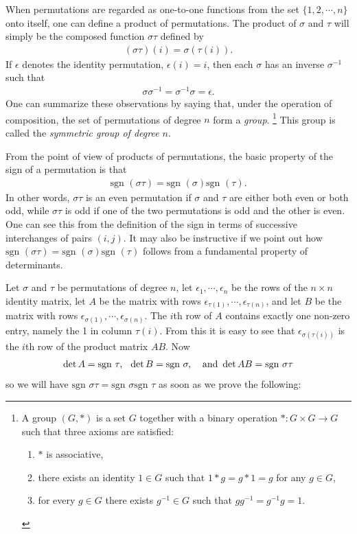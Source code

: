 \documentclass[12pt,letterpaper,reqno]{article}
\numberwithin{equation}{section}
\newcommand{\ti}[1]{\textit{#1}}
\begin{document}
When permutations are regarded as one-to-one functions from the set $\{1,2,\cdots,n\}$ onto itself, one can define a product of permutations. The product of $\sigma$ and $\tau$ will simply be the composed function $\sigma \tau$ defined by
\begin{align*}
	(\sigma \tau)(i)=\sigma(\tau(i)).
\end{align*}
If $\epsilon$ denotes the identity permutation, $\epsilon(i)=i$, then each $\sigma$ has an inverse $\sigma^{-1}$ such that 
\begin{align*}
	\sigma\sigma^{-1}=\sigma^{-1}\sigma=\epsilon.
\end{align*}
One can summarize these observations by saying that, under the operation of composition, the set of permutations of degree $n$ form a \ti{group}. \footnote{A group $(G,*)$ is a set $G$ together with a binary operation $*:G \times G \to G$ such that three axioms are satisfied: \begin{enumerate}
	\item $*$ is associative,
	\item there exists an identity $1 \in G$ such that $1*g=g*1=g$ for any $g \in G$,
	\item for every $g \in G$ there exists $g^{-1} \in G$ such that $gg^{-1}=g^{-1}g=1$.
\end{enumerate}} This group is called the \ti{symmetric group of degree $n$}.

From the point of view of products of permutations, the basic property of the sign of a permutation is that 
\begin{align*}
	\text{sgn } (\sigma \tau)=\text{sgn } (\sigma)\text{sgn } (\tau).
\end{align*}
In other words, $\sigma\tau$ is an even permutation if $\sigma$ and $\tau$ are either both even or both odd, while $\sigma\tau$ is odd if one of the two permutations is odd and the other is even. One can see this from the definition of the sign in terms of successive interchanges of pairs $(i,j)$. It may also be instructive if we point out how $\text{sgn } (\sigma \tau)=\text{sgn } (\sigma)\text{sgn } (\tau)$ follows from a fundamental property of determinants.

Let $\sigma$ and $\tau$ be permutations of degree $n$, let $\epsilon_1,\cdots, \epsilon_n$ be the rows of the $n \times n$ identity matrix, let $A$ be the matrix with rows $\epsilon_{\tau(1)},\cdots, \epsilon_{\tau(n)}$, and let $B$ be the matrix with rows $\epsilon_{\sigma(1)},\cdots, \epsilon_{\sigma(n)}$. The $i$th row of $A$ contains exactly one non-zero entry, namely the 1 in column $\tau(i)$. From this it is easy to see that $\epsilon_{\sigma(\tau(i))}$ is the $i$th row of the product matrix $AB$. Now
\begin{align*}
	\det A = \text{sgn }\tau, \hspace{0.25cm} \det B = \text{sgn }\sigma, \hspace{0.25cm} \text{ and } \det AB = \text{sgn }\sigma\tau
\end{align*}
so we will have $\text{sgn }\sigma\tau=\text{sgn }\sigma \text{sgn }\tau$ as soon as we prove the following:
\end{document}
